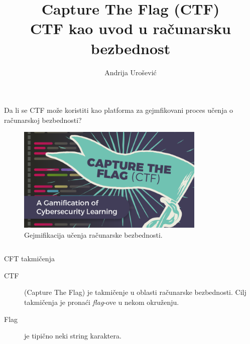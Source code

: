 \documentclass{beamer}
\author[andrija.urosevic@protonmail.com]{Andrija Urošević}
\title{Capture The Flag (CTF)\\  CTF kao uvod u računarsku bezbednost}
\institute{Univerzitet u Beogradu\\ Matematički fakultet}
\begin{document}
\begin{frame}[fragile]
    \centering


    \begin{block}
        {Da li se CTF može koristiti kao platforma za gejmfikovani proces 
        učenja o računarskoj bezbednosti?}
        \begin{figure}
            \centering
            \includegraphics[width=0.8\textwidth]{Slike/ctf_gami.png}
            \caption{Gejmifikacija učenja računarske
            bezbednosti.}\label{fig:ctfgami}
        \end{figure}
    \end{block}


    \begin{columns}[T]

        \begin{column}{.46\textwidth}


            \begin{block}{CFT takmičenja}
                \begin{description}
                    \item [CTF] (Capture The Flag) je takmičenje u oblasti
                        računarske bezbednosti. Cilj takmičenja je pronaći
                        \emph{flag}-ove u nekom okruženju.
                    \item [Flag] je tipično neki string karaktera.
                \end{description}
            \end{block}


\end{column}
\end{columns}
\end{frame}
\end{document}
